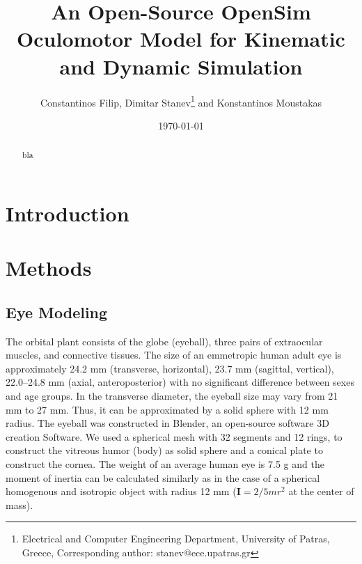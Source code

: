 \documentclass[11pt,a4paper,draft=false]{report}
\title{An Open-Source OpenSim Oculomotor Model for Kinematic and Dynamic
  Simulation}
\author{Constantinos Filip, Dimitar Stanev\footnote{Electrical and Computer
    Engineering Department, University of Patras, Greece, Corresponding author:
    stanev@ece.upatras.gr} and Konstantinos Moustakas}
\date{\today}
\newcommand{\mat}[1]{\bm{#1}}
\begin{document}

\maketitle

\begin{abstract}
  bla
\end{abstract}

\section*{Introduction}\label{sec:introduction}

\section*{Methods}\label{sec:methods}

\subsection*{Eye Modeling}\label{sec:eye-Modeling}

The orbital plant consists of the globe (eyeball), three pairs of extraocular
muscles, and connective tissues. The size of an emmetropic human adult eye is
approximately 24.2 mm (transverse, horizontal), 23.7 mm (sagittal, vertical),
22.0–24.8 mm (axial, anteroposterior) with no significant difference between
sexes and age groups. In the transverse diameter, the eyeball size may vary from
21 mm to 27 mm. Thus, it can be approximated by a solid sphere with 12 mm
radius. The eyeball was constructed in Blender, an open-source software 3D
creation Software. We used a spherical mesh with 32 segments and 12 rings, to
construct the vitreous humor (body) as solid sphere and a conical plate to
construct the cornea. The weight of an average human eye is 7.5 g and the
moment of inertia can be calculated similarly as in the case of a spherical
homogenous and isotropic object with radius 12 mm ($\mat{I} = 2/5 m r^2$ at the
center of mass).

\end{document}
